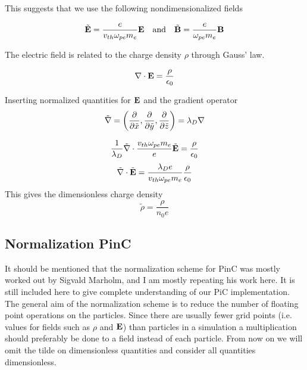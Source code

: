        This suggests that we use the following nondimensionalized fields

        \begin{equation}
            \tilde{\vb{E}} = \frac{e}{v_{th}\omega_{pe}m_e}\vb{E} \quad{\text{and}} \quad \tilde{\vb{B}} = \frac{e}{\omega_{pe}m_e}\vb{B}
        \end{equation}

        The electric field is related to the charge density \(\rho\) through Gauss'
        law.

        \begin{equation}
            \nabla \cdot \vb{E} = \frac{\rho}{\epsilon_0}
        \end{equation}

        Inserting normalized quantities for \(\vb{E}\) and the gradient operator
        \[\tilde{\nabla}=\left(\pdv{\tilde x}, \pdv{\tilde y} , \pdv{\tilde z}\right) = \lambda_D \nabla\]

        \begin{equation}
            \frac{1}{\lambda_D}\tilde\nabla \cdot \frac{v_{th}\omega_{pe}m_e}{e}\tilde{\vb{E}} = \frac{\rho}{\epsilon_0}
        \end{equation}
        \begin{equation}
            \tilde\nabla \cdot\tilde{\vb{E}} = \frac{\lambda_De}{v_{th}\omega_{pe}m_e}\frac{\rho}{\epsilon_0}
        \end{equation}
        This gives the dimensionless charge density
        \begin{equation}
            \tilde \rho = \frac{\rho}{n_0e}
        \end{equation}

    \subsection{Normalization PinC}
        It should be mentioned that the normalization scheme for PinC was mostly worked
        out by Sigvald Marholm, and I am mostly repeating his work here. It is still
        included here to give complete understanding of our PiC implementation.
        The general aim of the normalization scheme is to reduce the number of
        floating point operations on the particles. Since there are usually
        fewer grid points (i.e. values for fields such as \(\rho\) and \(\vb{E}\))
        than particles in a simulation a multiplication should preferably be done to
        a field instead of each particle. From now on we will omit the tilde on dimensionless
        quantities and consider all quantities dimensionless.

